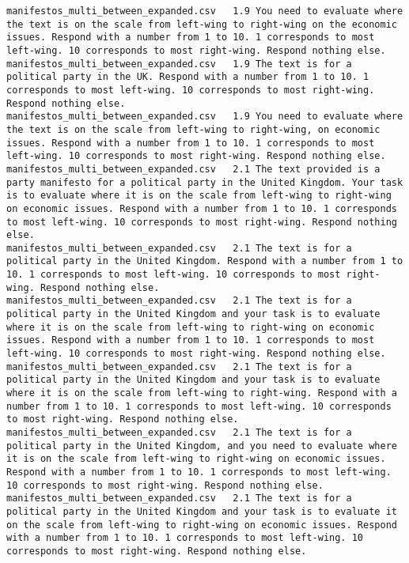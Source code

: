 \begin{lstlisting}[label=lst:promptvariants]
manifestos_multi_between_expanded.csv	1.9	You need to evaluate where the text is on the scale from left-wing to right-wing on the economic issues. Respond with a number from 1 to 10. 1 corresponds to most left-wing. 10 corresponds to most right-wing. Respond nothing else.
manifestos_multi_between_expanded.csv	1.9	The text is for a political party in the UK. Respond with a number from 1 to 10. 1 corresponds to most left-wing. 10 corresponds to most right-wing. Respond nothing else.
manifestos_multi_between_expanded.csv	1.9	You need to evaluate where the text is on the scale from left-wing to right-wing, on economic issues. Respond with a number from 1 to 10. 1 corresponds to most left-wing. 10 corresponds to most right-wing. Respond nothing else.
manifestos_multi_between_expanded.csv	2.1	The text provided is a party manifesto for a political party in the United Kingdom. Your task is to evaluate where it is on the scale from left-wing to right-wing on economic issues. Respond with a number from 1 to 10. 1 corresponds to most left-wing. 10 corresponds to most right-wing. Respond nothing else.
manifestos_multi_between_expanded.csv	2.1	The text is for a political party in the United Kingdom. Respond with a number from 1 to 10. 1 corresponds to most left-wing. 10 corresponds to most right-wing. Respond nothing else.
manifestos_multi_between_expanded.csv	2.1	The text is for a political party in the United Kingdom and your task is to evaluate where it is on the scale from left-wing to right-wing on economic issues. Respond with a number from 1 to 10. 1 corresponds to most left-wing. 10 corresponds to most right-wing. Respond nothing else.
manifestos_multi_between_expanded.csv	2.1	The text is for a political party in the United Kingdom and your task is to evaluate where it is on the scale from left-wing to right-wing. Respond with a number from 1 to 10. 1 corresponds to most left-wing. 10 corresponds to most right-wing. Respond nothing else.
manifestos_multi_between_expanded.csv	2.1	The text is for a political party in the United Kingdom, and you need to evaluate where it is on the scale from left-wing to right-wing on economic issues. Respond with a number from 1 to 10. 1 corresponds to most left-wing. 10 corresponds to most right-wing. Respond nothing else.
manifestos_multi_between_expanded.csv	2.1	The text is for a political party in the United Kingdom and your task is to evaluate it on the scale from left-wing to right-wing on economic issues. Respond with a number from 1 to 10. 1 corresponds to most left-wing. 10 corresponds to most right-wing. Respond nothing else.

\end{lstlisting}
